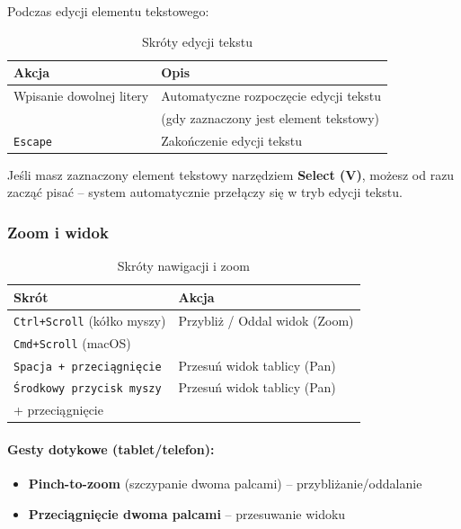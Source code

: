 \documentclass[12pt,a4paper]{article}
\begin{document}
Podczas edycji elementu tekstowego:

\begin{table}[H]
\centering
\begin{tabular}{|l|l|}
\hline
\textbf{Akcja} & \textbf{Opis} \\
\hline
Wpisanie dowolnej litery & Automatyczne rozpoczęcie edycji tekstu \\
& (gdy zaznaczony jest element tekstowy) \\
\hline
\texttt{Escape} & Zakończenie edycji tekstu \\
\hline
\end{tabular}
\caption{Skróty edycji tekstu}
\label{tab:text_edit_shortcuts}
\end{table}

\begin{tcolorbox}[colback=green!5!white,colframe=green!75!black,title=\faLightbulb\ Pro Tip]
Jeśli masz zaznaczony element tekstowy narzędziem \textbf{Select (V)}, możesz od razu zacząć pisać -- system automatycznie przełączy się w tryb edycji tekstu.
\end{tcolorbox}

\subsubsection{Zoom i widok}

\begin{table}[H]
\centering
\begin{tabular}{|l|l|}
\hline
\textbf{Skrót} & \textbf{Akcja} \\
\hline
\texttt{Ctrl+Scroll} (kółko myszy) & Przybliż / Oddal widok (Zoom) \\
\texttt{Cmd+Scroll} (macOS) & \\
\hline
\texttt{Spacja + przeciągnięcie} & Przesuń widok tablicy (Pan) \\
\hline
\texttt{Środkowy przycisk myszy} & Przesuń widok tablicy (Pan) \\
+ przeciągnięcie & \\
\hline
\end{tabular}
\caption{Skróty nawigacji i zoom}
\label{tab:zoom_shortcuts}
\end{table}

\paragraph{Gesty dotykowe (tablet/telefon):}

\begin{itemize}
    \item \textbf{Pinch-to-zoom} (szczypanie dwoma palcami) -- przybliżanie/oddalanie
    \item \textbf{Przeciągnięcie dwoma palcami} -- przesuwanie widoku
\end{itemize}
\end{document}
